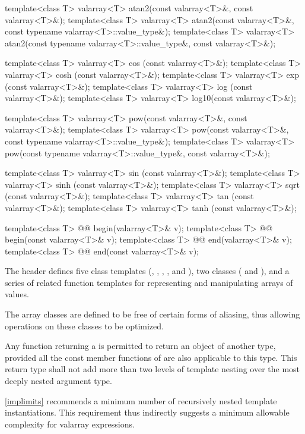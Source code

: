 \begin{codeblock}
{  template<class T> valarray<T> atan2(const valarray<T>&, const valarray<T>&);
  template<class T> valarray<T> atan2(const valarray<T>&,
                                      const typename valarray<T>::value_type&);
  template<class T> valarray<T> atan2(const typename valarray<T>::value_type&,
                                      const valarray<T>&);

  template<class T> valarray<T> cos  (const valarray<T>&);
  template<class T> valarray<T> cosh (const valarray<T>&);
  template<class T> valarray<T> exp  (const valarray<T>&);
  template<class T> valarray<T> log  (const valarray<T>&);
  template<class T> valarray<T> log10(const valarray<T>&);

  template<class T> valarray<T> pow(const valarray<T>&, const valarray<T>&);
  template<class T> valarray<T> pow(const valarray<T>&, const typename valarray<T>::value_type&);
  template<class T> valarray<T> pow(const typename valarray<T>::value_type&, const valarray<T>&);

  template<class T> valarray<T> sin  (const valarray<T>&);
  template<class T> valarray<T> sinh (const valarray<T>&);
  template<class T> valarray<T> sqrt (const valarray<T>&);
  template<class T> valarray<T> tan  (const valarray<T>&);
  template<class T> valarray<T> tanh (const valarray<T>&);

  template<class T> @@ begin(valarray<T>& v);
  template<class T> @@ begin(const valarray<T>& v);
  template<class T> @@ end(valarray<T>& v);
  template<class T> @@ end(const valarray<T>& v);
}
\end{codeblock}

\pnum
The header  defines five class templates
(,
,
,
,
and
),
two classes (
and
),
and a series of related
function templates
for representing
and manipulating arrays of values.

\pnum
The
array classes
are defined to be free of certain forms of aliasing, thus allowing
operations on these classes to be optimized.

\pnum
Any function returning a
is permitted to return an object of another type, provided all the
const member functions of
are also applicable to this type.
This return type shall not add
more than two levels of template nesting over the most deeply nested
argument type.
\begin{footnote}
\ref{implimits} recommends a minimum number
of recursively nested template
instantiations.
This requirement thus indirectly suggests a minimum
allowable complexity for valarray expressions.
\end{footnote}

